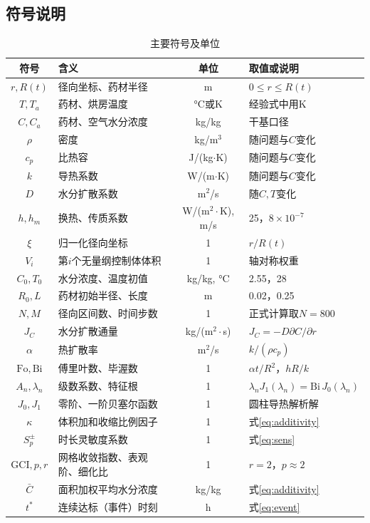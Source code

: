 \documentclass[zihao=-4,UTF8]{ctexart}
\begin{document}
\subsection{符号说明}
\begin{table}[H]\centering\small
\caption{主要符号及单位}\label{tab:symbols}
\begin{tabularx}{\textwidth}{cYcY}
\toprule 符号 & 含义 & 单位 & 取值或说明 \\
\midrule $r,R(t)$ & 径向坐标、药材半径 & m & $0\le r\le R(t)$ \\
$T,T_a$ & 药材、烘房温度 & °C或K & 经验式中用K \\
$C,C_a$ & 药材、空气水分浓度 & kg/kg & 干基口径 \\
$\rho$ & 密度 & kg/m$^3$ & 随问题与$C$变化 \\
$c_p$ & 比热容 & J/(kg$\cdot$K) & 随问题与$C$变化 \\
$k$ & 导热系数 & W/(m$\cdot$K) & 随问题与$C$变化 \\
$D$ & 水分扩散系数 & m$^2$/s & 随$C,T$变化 \\
$h,h_m$ & 换热、传质系数 & W/(m$^2\cdot$K), m/s & 25，$8\times10^{-7}$ \\
$\xi$ & 归一化径向坐标 & 1 & $r/R(t)$ \\
$V_i$ & 第$i$个无量纲控制体体积 & 1 & 轴对称权重 \\
$C_0,T_0$ & 水分浓度、温度初值 & kg/kg, °C & 2.55，28 \\
$R_0,L$ & 药材初始半径、长度 & m & 0.02，0.25 \\
$N,M$ & 径向区间数、时间步数 & 1 & 正式计算取$N=800$ \\
$J_C$ & 水分扩散通量 & kg/(m$^2\cdot$s) & $J_C=-D\partial C/\partial r$ \\
$\alpha$ & 热扩散率 & m$^2$/s & $k/(\rho c_p)$ \\
$\mathrm{Fo},\mathrm{Bi}$ & 傅里叶数、毕渥数 & 1 & $\alpha t/R^2$，$hR/k$ \\
$A_n,\lambda_n$ & 级数系数、特征根 & 1 & $\lambda_nJ_1(\lambda_n)=\mathrm{Bi}\,J_0(\lambda_n)$ \\
$J_0,J_1$ & 零阶、一阶贝塞尔函数 & 1 & 圆柱导热解析解 \\
$\kappa$ & 体积加和收缩比例因子 & 1 & 式\eqref{eq:additivity} \\
$S_p^{\pm}$ & 时长灵敏度系数 & 1 & 式\eqref{eq:sens} \\
$\mathrm{GCI},p,r$ & 网格收敛指数、表观阶、细化比 & 1 & $r=2$，$p\approx2$ \\
$\bar C$ & 面积加权平均水分浓度 & kg/kg & 式\eqref{eq:additivity} \\
$t^*$ & 连续达标（事件）时刻 & h & 式\eqref{eq:event} \\
\bottomrule
\end{tabularx}
\end{table}
\end{document}
